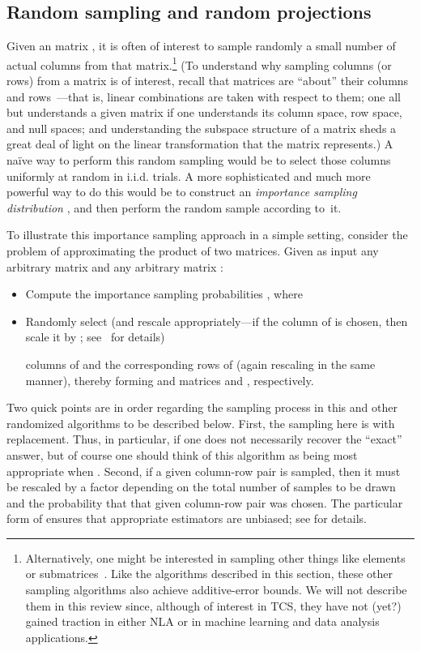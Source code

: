 \documentclass[twoside]{article}
\begin{document}
\subsection{Random sampling and random projections}
\label{sxn:background2:misc-stuff}

Given an  matrix , it is often of interest to sample 
randomly a small number of actual columns 
from that matrix.\footnote{Alternatively, one might be interested in sampling other things 
like elements~\cite{AM07_JRNL} or submatrices~\cite{FK99}.  Like the 
algorithms described in this section, these other sampling algorithms also 
achieve additive-error bounds.  We will not describe them in this review 
since, although of interest in TCS, they have not (yet?) gained traction in 
either NLA or in machine learning and data analysis applications.}
(To understand why sampling columns (or rows) from a matrix is of interest, 
recall that matrices are ``about'' their columns and 
rows~\cite{Strang88}---that is, linear combinations 
are taken with respect to them; one all but understands a given matrix if one 
understands its column space, row space, and null spaces; and understanding 
the subspace structure of a matrix sheds a great deal of light on the linear 
transformation that the matrix represents.)
A na\"{i}ve way to perform this random sampling would be to select 
those columns uniformly at random in i.i.d. trials.
A more sophisticated and much more powerful way to do this would be to 
construct an \emph{importance sampling distribution} , 
and then perform the random sample according to~it.

To illustrate this importance sampling approach in a simple setting, 
consider the problem of approximating the product of two matrices.
Given as input any arbitrary  matrix  and any arbitrary 
 matrix :
\begin{itemize}
\item
Compute the importance sampling probabilities , where 

\item
Randomly select (and rescale appropriately---if the  column of 
is chosen, then scale it by ; see~\cite{dkm_matrix1} for 
details) 
 
columns of  and the corresponding rows of  (again rescaling in the 
same manner), thereby forming  and  matrices  
and , respectively.
\end{itemize}
Two quick points are in order regarding the sampling process in this and 
other randomized algorithms to be described below.
First, the sampling here is with replacement.
Thus, in particular, if  one does not necessarily recover the ``exact'' 
answer, but of course one should think of this algorithm as being most 
appropriate when .
Second, if a given column-row pair is sampled, then it must be rescaled by a 
factor depending on the total number of samples to be drawn and the 
probability that that given column-row pair was chosen.
The particular form of  ensures that appropriate estimators are 
unbiased; see \cite{dkm_matrix1} for details.
\end{document}
